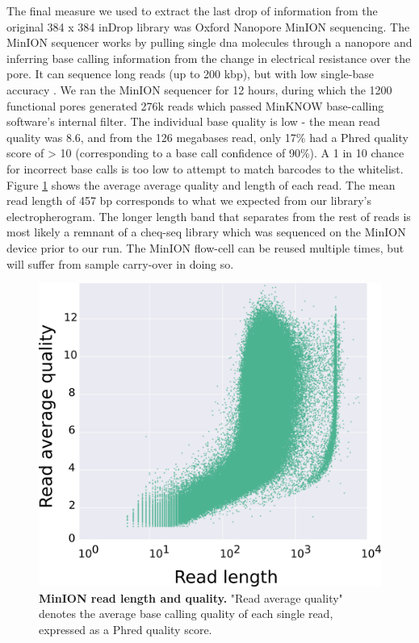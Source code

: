 The final measure we used to extract the last drop of information from the original 384 x 384 inDrop library was Oxford Nanopore MinION sequencing. The MinION sequencer works by pulling single \acrshort{dna} molecules through a nanopore and inferring base calling information from the change in electrical resistance over the pore. It can sequence long reads (up to 200 kbp), but with low single-base accuracy \citep{bowden2019}. We ran the MinION sequencer for 12 hours, during which the 1200 functional pores generated 276k reads which passed MinKNOW base-calling software's internal filter. The individual base quality is low - the mean read quality was 8.6, and from the 126 megabases read, only 17\% had a Phred quality score of > 10 (corresponding to a base call confidence of 90\%). A 1 in 10 chance for incorrect base calls is too low to attempt to match barcodes to the whitelist. Figure \ref{fig:seq_minion_qual} shows the average average quality and length of each read. The mean read length of 457 bp corresponds to what we expected from our library's electropherogram. The longer length band that separates from the rest of reads is most likely a remnant of a \acrshort{cheq-seq} library which was sequenced on the MinION device prior to our run. The MinION flow-cell can be reused multiple times, but will suffer from sample carry-over in doing so.\pms

\begin{figure}[ht]
\centerfloat
\includegraphics[width=\textwidth/3*2]{./ims/seq_minion_jasper.png}
\caption[MinION read length and quality]{\textbf{MinION read length and quality.} "Read average quality" denotes the average base calling quality of each single read, expressed as a Phred quality score.}
\label{fig:seq_minion_qual}
\end{figure}

